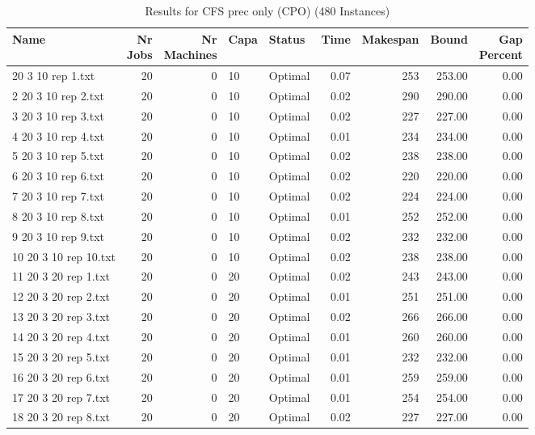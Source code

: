 \begin{longtable}{lrrllrrrr}
\caption{Results for CFS prec only (CPO) (480 Instances)}\\\toprule
Name & \shortstack{Nr\\Jobs} & \shortstack{Nr\\Machines} & Capa & Status  & Time & Makespan & Bound & \shortstack{Gap\\Percent}\\ \midrule
\endhead
\bottomrule
\endfoot
1 20 3 10 rep 1.txt & 20 & 0 & 10 & Optimal &  0.07 & 253 & 253.00 &  0.00\\
2 20 3 10 rep 2.txt & 20 & 0 & 10 & Optimal &  0.02 & 290 & 290.00 &  0.00\\
3 20 3 10 rep 3.txt & 20 & 0 & 10 & Optimal &  0.02 & 227 & 227.00 &  0.00\\
4 20 3 10 rep 4.txt & 20 & 0 & 10 & Optimal &  0.01 & 234 & 234.00 &  0.00\\
5 20 3 10 rep 5.txt & 20 & 0 & 10 & Optimal &  0.02 & 238 & 238.00 &  0.00\\
6 20 3 10 rep 6.txt & 20 & 0 & 10 & Optimal &  0.02 & 220 & 220.00 &  0.00\\
7 20 3 10 rep 7.txt & 20 & 0 & 10 & Optimal &  0.02 & 224 & 224.00 &  0.00\\
8 20 3 10 rep 8.txt & 20 & 0 & 10 & Optimal &  0.01 & 252 & 252.00 &  0.00\\
9 20 3 10 rep 9.txt & 20 & 0 & 10 & Optimal &  0.02 & 232 & 232.00 &  0.00\\
10 20 3 10 rep 10.txt & 20 & 0 & 10 & Optimal &  0.02 & 238 & 238.00 &  0.00\\
11 20 3 20 rep 1.txt & 20 & 0 & 20 & Optimal &  0.02 & 243 & 243.00 &  0.00\\
12 20 3 20 rep 2.txt & 20 & 0 & 20 & Optimal &  0.01 & 251 & 251.00 &  0.00\\
13 20 3 20 rep 3.txt & 20 & 0 & 20 & Optimal &  0.02 & 266 & 266.00 &  0.00\\
14 20 3 20 rep 4.txt & 20 & 0 & 20 & Optimal &  0.01 & 260 & 260.00 &  0.00\\
15 20 3 20 rep 5.txt & 20 & 0 & 20 & Optimal &  0.01 & 232 & 232.00 &  0.00\\
16 20 3 20 rep 6.txt & 20 & 0 & 20 & Optimal &  0.01 & 259 & 259.00 &  0.00\\
17 20 3 20 rep 7.txt & 20 & 0 & 20 & Optimal &  0.01 & 254 & 254.00 &  0.00\\
18 20 3 20 rep 8.txt & 20 & 0 & 20 & Optimal &  0.02 & 227 & 227.00 &  0.00\\

\end{longtable}
